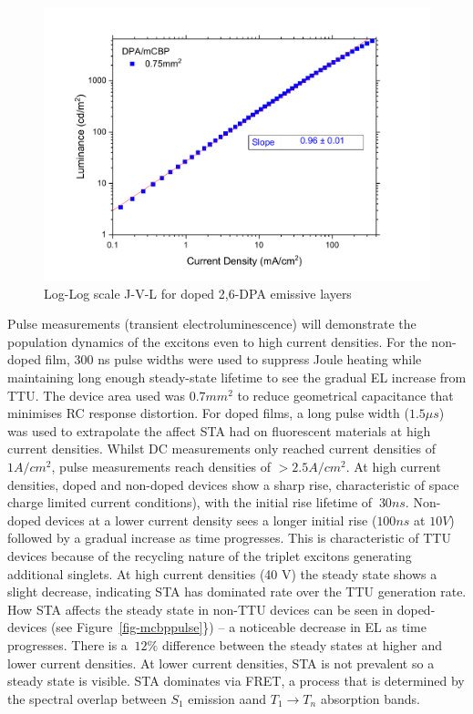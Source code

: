 \documentclass[
  letterpaper,
  DIV=11,
  numbers=noendperiod,
  oneside]{scrreprt}
\begin{document}
\begin{figure}
\begin{minipage}[t]{0.50\linewidth}
{{\includegraphics{./images/mCBPfit.pdf}

}

\caption{\label{fig-mcbpfit}Log-Log scale J-V-L for doped 2,6-DPA
emissive layers}

}

\end{minipage}%

\end{figure}

Pulse measurements (transient electroluminescence) will demonstrate the
population dynamics of the excitons even to high current densities. For
the non-doped film, 300 ns pulse widths were used to suppress Joule
heating while maintaining long enough steady-state lifetime to see the
gradual EL increase from TTU. The device area used was \(0.7mm^2\) to
reduce geometrical capacitance that minimises RC response distortion.
For doped films, a long pulse width (\(1.5\mu s\)) was used to
extrapolate the affect STA had on fluorescent materials at high current
densities. Whilst DC measurements only reached current densities of
\(1 A/cm^2\), pulse measurements reach densities of \(>2.5 A/cm^2\). At
high current densities, doped and non-doped devices show a sharp rise,
characteristic of space charge limited current conditions), with the
initial rise lifetime of \(~30 ns\). Non-doped devices at a lower
current density sees a longer initial rise (\(100ns\) at \(10 V\))
followed by a gradual increase as time progresses. This is
characteristic of TTU devices because of the recycling nature of the
triplet excitons generating additional singlets. At high current
densities (40 V) the steady state shows a slight decrease, indicating
STA has dominated rate over the TTU generation rate. How STA affects the
steady state in non-TTU devices can be seen in doped-devices (see
Figure~\ref{fig-mcbppulse}\}) -- a noticeable decrease in EL as time
progresses. There is a \(~12\%\) difference between the steady states at
higher and lower current densities. At lower current densities, STA is
not prevalent so a steady state is visible. STA dominates via FRET, a
process that is determined by the spectral overlap between \(S_1\)
emission aand \(T_1\rightarrow T_n\) absorption bands.
\end{document}
